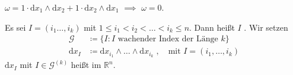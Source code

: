 \begin{example} \label{thm:12.9}
  $\omega = 1 \cdot \mathrm{d}x_1 \wedge \mathrm{d}x_2 + 1 \cdot \mathrm{d}x_2 \wedge \mathrm{d}x_1$ $\implies$ $\omega = 0$.
\end{example}

\begin{theorem}[Definition] \label{thm:12.10}
  Es sei $I = (i_1\ldots,i_k)$ mit $1 \leq i_1 < i_2 < \ldots < i_k \leq n$. Dann heißt $I$ . Wir setzen 
  \begin{align*}
    \mathcal{G} &\coloneq \{ I : I \text{ wachender Index der Länge } k \} \\
    \mathrm{d}x_I &\coloneq \mathrm{d}x_{i_1} \wedge \ldots \wedge \mathrm{d}x_{i_k} \; , \quad \text{mit } I = (i_1,\ldots,i_k)
  \end{align*}
  $\mathrm{d}x_I$ mit $I \in \mathcal{G}^{(k)}$ heißt  im $\mathbb{R}^n$.
\end{theorem}

